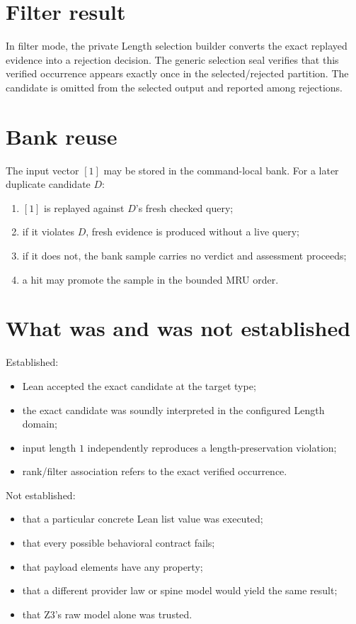 \documentclass[10pt,letterpaper,oneside]{report}
\begin{document}
\section{Filter result}

In filter mode, the private Length selection builder converts the exact replayed evidence into a rejection decision. The generic selection seal verifies that this verified occurrence appears exactly once in the selected/rejected partition. The candidate is omitted from the selected output and reported among rejections.

\section{Bank reuse}

The input vector $[1]$ may be stored in the command-local bank. For a later duplicate candidate $D$:

\begin{enumerate}
\item $[1]$ is replayed against $D$'s fresh checked query;
\item if it violates $D$, fresh evidence is produced without a live query;
\item if it does not, the bank sample carries no verdict and assessment proceeds;
\item a hit may promote the sample in the bounded MRU order.
\end{enumerate}

\section{What was and was not established}

Established:

\begin{itemize}
\item Lean accepted the exact candidate at the target type;
\item the exact candidate was soundly interpreted in the configured Length domain;
\item input length $1$ independently reproduces a length-preservation violation;
\item rank/filter association refers to the exact verified occurrence.
\end{itemize}

Not established:

\begin{itemize}
\item that a particular concrete Lean list value was executed;
\item that every possible behavioral contract fails;
\item that payload elements have any property;
\item that a different provider law or spine model would yield the same result;
\item that Z3's raw model alone was trusted.
\end{itemize}
\end{document}
